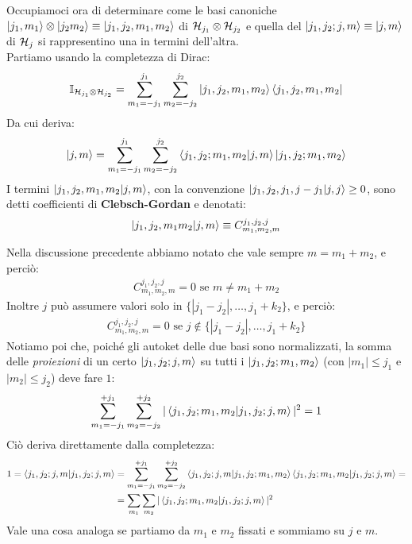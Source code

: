 \documentclass[../../FisicaTeorica.tex]{subfiles}
\begin{document}
Occupiamoci ora di determinare come le basi canoniche $\ket{j_1, m_1} \otimes \ket{j_2 m_2} \equiv \ket{j_1, j_2, m_1, m_2}$ di $\mathcal{H}_{j_1} \otimes \mathcal{H}_{j_2}$ e quella del  $\ket{j_1, j_2;j,m}\equiv \ket{j,m}$ di $\mathcal{H}_{j}$ si rappresentino una in termini dell'altra.\\
Partiamo usando la completezza di Dirac:
\begin{align*}
\mathbb{I}_{\mathcal{H}_{j_1}\otimes \mathcal{H}_{j_2}} = \sum_{m_1 = -j_1}^{j_1} \sum_{m_2 = -j_2}^{j_2} \ket{j_1, j_2, m_1, m_2}\bra{j_1, j_2, m_1, m_2}
\end{align*}
Da cui deriva:
\begin{align}
\ket{j,m}= \sum_{m_1 = -j_1}^{j_1} \sum_{m_2 = -j_2}^{j_2} \braket{j_1, j_2; m_1, m_2| j, m} \ket{j_1, j_2; m_1, m_2}
\label{eqn:completezza-momento-composto}
\end{align}
I termini $\ket{j_1, j_2, m_1, m_2 | j, m}$, con la convenzione $\ket{j_1, j_2, j_1, j - j_1 | j, j} \geq 0$, sono detti coefficienti di \textbf{Clebsch-Gordan} e denotati:
\begin{align*}
\ket{j_1, j_2, m_1 m_2 | j, m}  \equiv C^{j_1, j_2, j}_{m_1, m_2, m}
\end{align*}

Nella discussione precedente abbiamo notato che vale sempre $m=m_1+m_2$, e perciò:
\begin{align*}
C^{j_1, j_2, j}_{m_1,m_2, m} =0 \text{ se } m\neq m_1 + m_2
\end{align*}
Inoltre $j$ può assumere valori solo in $\{|j_1-j_2|, \dots, j_1+k_2\}$, e perciò:
\begin{align*}
C^{j_1, j_2, j}_{m_1, m_2, m} =0 \text{ se } j \notin \{|j_1-j_2|, \dots, j_1+k_2\}
\end{align*}
Notiamo poi che, poiché gli autoket delle due basi sono normalizzati, la somma delle \textit{proiezioni} di un certo $\ket{j_1, j_2; j, m}$ su tutti i $\ket{j_1, j_2; m_1, m_2}$ (con $|m_1| \leq j_1$ e $|m_2|\leq j_2$) deve fare $1$:
\begin{align*}
\sum_{m_1=-j_1}^{+j_1} \sum_{m_2 = -j_2}^{+j_2} |\braket{j_1, j_2; m_1, m_2| j_1, j_2; j, m}|^2 = 1
\end{align*}
Ciò deriva direttamente dalla completezza:
\begin{align}\nonumber
1=\braket{j_1, j_2; j,m|j_1, j_2; j, m} &= \sum_{m_1=-j_1}^{+j_1} \sum_{m_2 = -j_2}^{+j_2} \braket{j_1, j_2; j, m| j_1, j_2; m_1, m_2}\braket{j_1, j_2; m_1, m_2|j_1, j_2;j,m} =\\
&=\sum_{m_1}\sum_{m_2} |\braket{j_1, j_2; m_1, m_2|j_1, j_2;j,m}|^2
\label{eqn:normalizzazione-momento-composto}
\end{align}
Vale una cosa analoga se partiamo da $m_1$ e $m_2$ fissati e sommiamo su $j$ e $m$.\\
\end{document}
